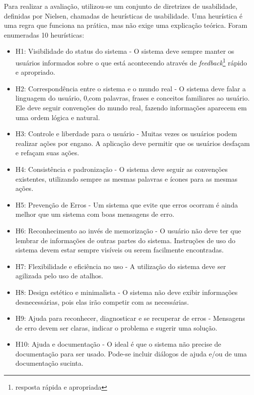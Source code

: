 Para realizar a avaliação, utilizou-se um conjunto de diretrizes de usabilidade, definidas por Nielsen, chamadas de heurísticas de usabilidade. Uma heurística é uma regra que funciona na prática, mas não exige uma explicação teórica. Foram enumeradas 10 heurísticas:

\begin{itemize}
    \item H1: Visibilidade do status do sistema - O sistema deve sempre manter os usuários informados sobre o que está acontecendo através de \textit{feedback}\footnote{resposta rápida e apropriada} rápido e apropriado.
    \item H2: Correspondência entre o sistema e o mundo real - O sistema deve falar a linguagem do usuário, 0,com palavras, frases e conceitos familiares ao usuário. Ele deve seguir convenções do mundo real, fazendo informações aparecem em uma ordem lógica e natural. 
    \item H3: Controle e liberdade para o usuário - Muitas vezes os usuários podem realizar ações por engano. A aplicação deve permitir que os usuários desfaçam e refaçam suas ações.
    \item H4: Consistência e padronização - O sistema deve seguir as convenções existentes, utilizando sempre as mesmas palavras e ícones para as mesmas ações.
    \item H5: Prevenção de Erros - Um sistema que evite que erros ocorram é ainda melhor que um sistema com boas mensagens de erro.
    \item H6: Reconhecimento ao invés de memorização - O usuário não deve ter que lembrar de informações de outras partes do sistema. Instruções de uso do sistema devem estar sempre visíveis ou serem facilmente encontradas.
    \item H7: Flexibilidade e eficiência no uso - A utilização do sistema deve ser agilizada pelo uso de atalhos.
    \item H8: Design estético e minimalista - O sistema não deve exibir informações desnecessárias, pois elas irão competir com as necessárias.
    \item H9: Ajuda para reconhecer, diagnosticar e se recuperar de erros - Mensagens de erro devem ser claras, indicar o problema e sugerir uma solução.
    \item H10: Ajuda e documentação - O ideal é que o sistema não precise de documentação para ser usado. Pode-se incluir diálogos de ajuda e/ou de uma documentação sucinta.
\end{itemize}

